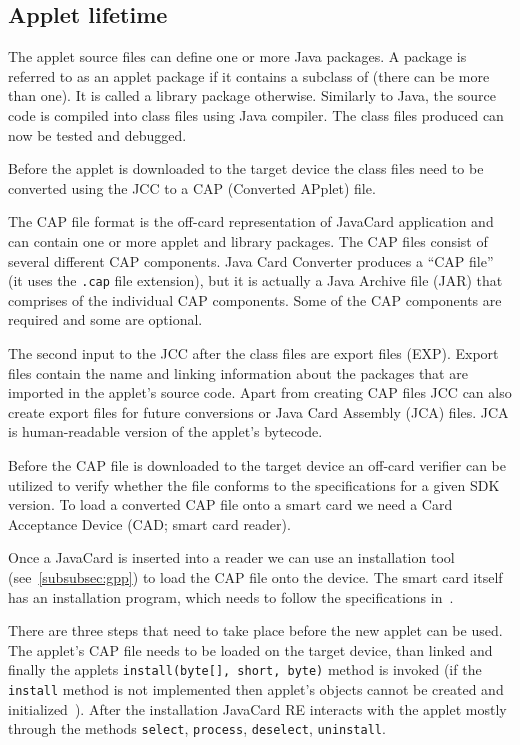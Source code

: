 \documentclass{../llncs/llncs}
\begin{document}
    \subsection{Applet lifetime}
The applet source files can define one or more Java packages. A package is referred to as an applet package if it contains a subclass of  (there can be more than one). It is called a library package otherwise.  Similarly to Java, the source code is compiled into class files using Java compiler. The class files produced can now be tested and debugged.

Before the applet is downloaded to the target device the class files need to be converted using the JCC to a CAP (Converted APplet) file.

The CAP file format is the off-card representation of JavaCard application and can contain one or more applet and library packages. The CAP files consist of several different CAP components. Java Card Converter produces a ``CAP file'' (it uses the \texttt{.cap} file extension), but it is actually a Java Archive file (JAR) that comprises of the individual CAP components. Some of the CAP components are required and some are optional.

The second input to the JCC after the class files are export files (EXP). Export files contain the name and linking information about the packages that are imported in the applet's source code.
Apart from creating CAP files JCC can also create export files for future conversions or Java Card Assembly (JCA) files. JCA is human-readable version of the applet's bytecode.

Before the CAP file is downloaded to the target device an off-card verifier can be utilized to verify whether the file conforms to the specifications for a given SDK version. To load a converted CAP file onto a smart card we need a Card Acceptance Device (CAD; smart card reader).

Once a JavaCard is inserted into a reader we can use an installation tool (see~\ref{subsubsec:gpp}) to load the CAP file onto the device. The smart card itself has an installation program, which needs to follow the specifications in~\cite{jcspecs31download}.

There are three steps that need to take place before the new applet can be used. The applet's CAP file needs to be loaded on the target device, than linked and finally the applets \texttt{install(byte[], short, byte)} method is invoked (if the \texttt{install} method is not implemented then applet's objects cannot be created and initialized~\cite{jcspecs31download}). After the installation JavaCard RE interacts with the applet mostly through the methods \texttt{select}, \texttt{process}, \texttt{deselect}, \texttt{uninstall}.
\end{document}
